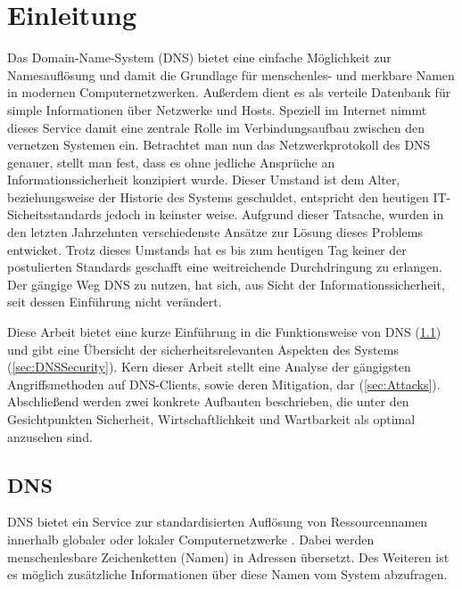\chapter{Einleitung}
Das Domain-Name-System (DNS) bietet eine einfache Möglichkeit zur Namesauflösung und damit die Grundlage für menschenles- und merkbare Namen in modernen Computernetzwerken. Außerdem dient es als verteile Datenbank für simple Informationen über Netzwerke und Hosts. Speziell im Internet nimmt dieses Service damit eine zentrale Rolle im Verbindungsaufbau zwischen den vernetzen Systemen ein. Betrachtet man nun das Netzwerkprotokoll des DNS genauer, stellt man fest, dass es ohne jedliche Ansprüche an Informationssicherheit konzipiert wurde. Dieser Umstand ist dem Alter, beziehungsweise der Historie des Systems geschuldet, entspricht den heutigen IT-Sicheitsstandards jedoch in keinster weise. Aufgrund dieser Tatsache, wurden in den letzten Jahrzehnten verschiedenste Ansätze zur Lösung dieses Problems entwicket. Trotz dieses Umstands hat es bis zum heutigen Tag keiner der postulierten Standards geschafft eine weitreichende Durchdringung zu erlangen. Der gängige Weg DNS zu nutzen, hat sich, aus Sicht der Informationssicherheit, seit dessen Einführung nicht verändert.



Diese Arbeit bietet eine kurze Einführung in die Funktionsweise von DNS (\ref{sec:DNS}) und gibt eine Übersicht der sicherheitsrelevanten Aspekten des Systems (\ref{sec:DNSSecurity}). Kern dieser Arbeit stellt eine Analyse der gängigsten Angriffsmethoden auf DNS-Clients, sowie deren Mitigation, dar (\ref{sec:Attacks}). Abschließend werden zwei konkrete Aufbauten beschrieben, die unter den Gesichtpunkten Sicherheit, Wirtschaftlichkeit und Wartbarkeit als optimal anzusehen sind. 

\section{DNS}
\label{sec:DNS}

DNS bietet ein Service zur standardisierten Auflösung von Ressourcennamen innerhalb globaler oder lokaler Computernetzwerke \cite{rfc1035}. Dabei werden menschenlesbare Zeichenketten (Namen) in Adressen übersetzt. Des Weiteren ist es möglich zusätzliche Informationen über diese Namen vom System abzufragen.


